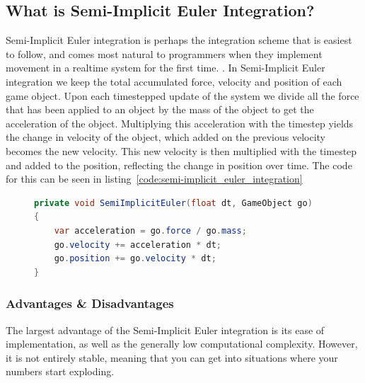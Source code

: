 %

\subsection{What is Semi-Implicit Euler Integration?}
Semi-Implicit Euler integration is perhaps the integration scheme that is easiest to follow, and comes most natural to programmers when they implement
movement in a realtime system for the first time. \cite{gafferongames_integration}.
In Semi-Implicit Euler integration we keep the total accumulated force, velocity and position of each game object.
Upon each timestepped update of the system we divide all the force that has been applied to an object by the mass of the object to get the acceleration of the object.
Multiplying this acceleration with the timestep yields the change in velocity of the object, which added on the previous velocity becomes the new velocity.
This new velocity is then multiplied with the timestep and added to the position, reflecting the change in position over time.
The code for this can be seen in listing~\ref{code:semi-implicit_euler_integration}

\begin{figure}
\begin{lstlisting}[label={code:semi-implicit_euler_integration},language=csharp,caption={Semi-Implicit Euler Integration}]
private void SemiImplicitEuler(float dt, GameObject go)
{
    var acceleration = go.force / go.mass;
    go.velocity += acceleration * dt;
    go.position += go.velocity * dt;
}
\end{lstlisting}
\end{figure}

\subsubsection{Advantages \& Disadvantages}
The largest advantage of the Semi-Implicit Euler integration is its ease of implementation, as well as the generally low computational complexity.
However, it is not entirely stable, meaning that you can get into situations where your numbers start exploding.

